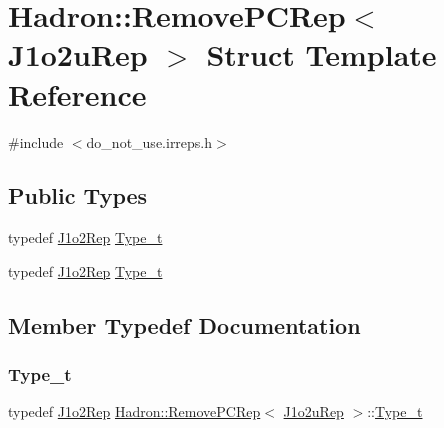 \hypertarget{structHadron_1_1RemovePCRep_3_01J1o2uRep_01_4}{}\section{Hadron\+:\+:Remove\+P\+C\+Rep$<$ J1o2u\+Rep $>$ Struct Template Reference}
\label{structHadron_1_1RemovePCRep_3_01J1o2uRep_01_4}


{\ttfamily \#include $<$do\+\_\+not\+\_\+use.\+irreps.\+h$>$}

\subsection*{Public Types}
\begin{DoxyCompactItemize}
\item 
typedef \mbox{\hyperlink{structHadron_1_1J1o2Rep}{J1o2\+Rep}} \mbox{\hyperlink{structHadron_1_1RemovePCRep_3_01J1o2uRep_01_4_a3bd356cdbefa21f279a298dcc9872b6a}{Type\+\_\+t}}
\item 
typedef \mbox{\hyperlink{structHadron_1_1J1o2Rep}{J1o2\+Rep}} \mbox{\hyperlink{structHadron_1_1RemovePCRep_3_01J1o2uRep_01_4_a3bd356cdbefa21f279a298dcc9872b6a}{Type\+\_\+t}}
\end{DoxyCompactItemize}


\subsection{Member Typedef Documentation}
\mbox{\label{structHadron_1_1RemovePCRep_3_01J1o2uRep_01_4_a3bd356cdbefa21f279a298dcc9872b6a}} 
\subsubsection{\texorpdfstring{Type\_t}{Type\_t}\hspace{0.1cm}{\footnotesize\ttfamily [1/2]}}
{\footnotesize\ttfamily typedef \mbox{\hyperlink{structHadron_1_1J1o2Rep}{J1o2\+Rep}} \mbox{\hyperlink{structHadron_1_1RemovePCRep}{Hadron\+::\+Remove\+P\+C\+Rep}}$<$ \mbox{\hyperlink{structHadron_1_1J1o2uRep}{J1o2u\+Rep}} $>$\+::\mbox{\hyperlink{structHadron_1_1RemovePCRep_3_01J1o2uRep_01_4_a3bd356cdbefa21f279a298dcc9872b6a}{Type\+\_\+t}}}

